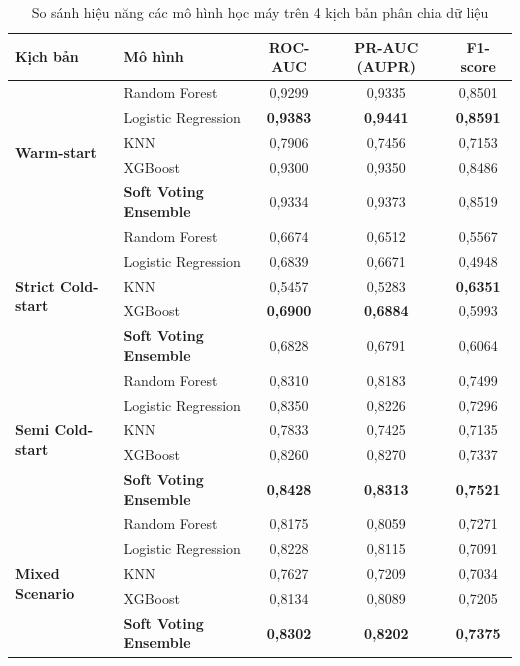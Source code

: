 \documentclass[12pt,a4paper,oneside]{report}
\begin{document}
\begin{table}[H]
  \centering
  \caption{So sánh hiệu năng các mô hình học máy trên 4 kịch bản phân chia dữ liệu}
  \label{tab:results_main}
  \begin{tabular}{llccc}
    \toprule
    \textbf{Kịch bản} & \textbf{Mô hình} & \textbf{ROC-AUC} & \textbf{PR-AUC (AUPR)} & \textbf{F1-score} \\
    \midrule
    \multirow{5}{*}{\textbf{Warm-start}}
      & Random Forest       & 0,9299 & 0,9335 & 0,8501 \\
      & Logistic Regression & \textbf{0,9383} & \textbf{0,9441} & \textbf{0,8591} \\
      & KNN                 & 0,7906 & 0,7456 & 0,7153 \\
      & XGBoost             & 0,9300 & 0,9350 & 0,8486 \\
      & \textbf{Soft Voting Ensemble} & 0,9334 & 0,9373 & 0,8519 \\
    \midrule
    \multirow{5}{*}{\textbf{Strict Cold-start}}
      & Random Forest       & 0,6674 & 0,6512 & 0,5567 \\
      & Logistic Regression & 0,6839 & 0,6671 & 0,4948 \\
      & KNN                 & 0,5457 & 0,5283 & \textbf{0,6351} \\
      & XGBoost             & \textbf{0,6900} & \textbf{0,6884} & 0,5993 \\
      & \textbf{Soft Voting Ensemble} & 0,6828 & 0,6791 & 0,6064 \\
    \midrule
    \multirow{5}{*}{\textbf{Semi Cold-start}}
      & Random Forest       & 0,8310 & 0,8183 & 0,7499 \\
      & Logistic Regression & 0,8350 & 0,8226 & 0,7296 \\
      & KNN                 & 0,7833 & 0,7425 & 0,7135 \\
      & XGBoost             & 0,8260 & 0,8270 & 0,7337 \\
      & \textbf{Soft Voting Ensemble} & \textbf{0,8428} & \textbf{0,8313} & \textbf{0,7521} \\
    \midrule
    \multirow{5}{*}{\textbf{Mixed Scenario}}
      & Random Forest       & 0,8175 & 0,8059 & 0,7271 \\
      & Logistic Regression & 0,8228 & 0,8115 & 0,7091 \\
      & KNN                 & 0,7627 & 0,7209 & 0,7034 \\
      & XGBoost             & 0,8134 & 0,8089 & 0,7205 \\
      & \textbf{Soft Voting Ensemble} & \textbf{0,8302} & \textbf{0,8202} & \textbf{0,7375} \\
    \bottomrule
  \end{tabular}
\end{table}
\end{document}
